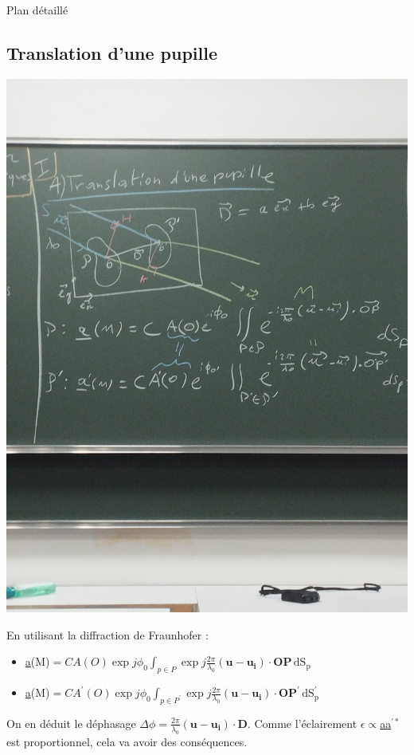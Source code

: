 \begin{reportBlock}{Plan détaillé}
  \subsection{Translation d'une pupille}
  \begin{center}
      \includegraphics[scale=0.1]{LP_DiffractionPeriodique/Translation_pupille.jpg}
  \end{center}
  En utilisant la diffraction de Fraunhofer :
  \begin{itemize}
      \item \underline{a}(M)$=CA(O)\exp{j\phi_0} \int_{p\in P} \exp{j\frac{2\pi}{\lambda_0}(\mathbf{u}-\mathbf{u_i})\cdot \mathbf{OP}} \, \mathrm{dS_p} $
      \item \underline{a}(M)$=CA^{'}(O)\exp{j\phi_0} \int_{p\in P^{'}} \exp{j\frac{2\pi}{\lambda_0}(\mathbf{u}-\mathbf{u_i})\cdot \mathbf{OP^{'}}} \, \mathrm{dS_p^{'}} $
  \end{itemize}
  On en déduit le déphasage $\Delta \phi = \frac{2\pi}{\lambda_0}(\mathbf{u}-\mathbf{u_i})\cdot\mathbf{D}$. Comme l'éclairement $\epsilon\propto$\underline{a}\underline{a$^{'*}$} est proportionnel, cela va avoir des conséquences.


\end{reportBlock}
